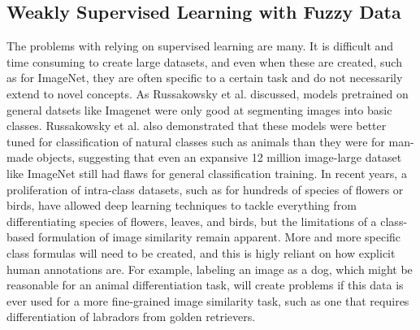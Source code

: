 %



\subsection{Weakly Supervised Learning with Fuzzy Data}
The problems with relying on supervised learning are many. It is difficult and time consuming to create large datasets, and even when these are created, such as for ImageNet, they are often specific to a certain task and do not necessarily extend to novel concepts. As Russakowsky et al. discussed\cite{russakovsky2013detecting}, models pretrained on general datsets like Imagenet were only good at segmenting images into basic classes. Russakowsky et al. also demonstrated that these models were better tuned for classification of natural classes such as animals than they were for man-made objects, suggesting that even an expansive 12 million image-large dataset like ImageNet still had flaws for general classification training. In recent years, a proliferation of intra-class datasets, such as for hundreds of species of flowers or birds, have allowed deep learning techniques to tackle everything from differentiating species of flowers\cite{angelova2013image}, leaves\cite{rejeb2013vantage}, and birds\cite{berg2014birdsnap}, but the limitations of a class-based formulation of image similarity remain apparent. More and more specific class formulas will need to be created, and this is higly reliant on how explicit human annotations are. For example, labeling an image as a dog, which might be reasonable for an animal differentiation task, will create problems if this data is ever used for a more fine-grained image similarity task, such as one that requires differentiation of labradors from golden retrievers.

